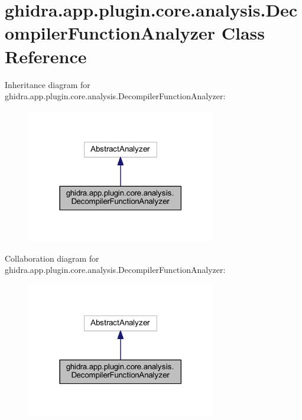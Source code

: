 \hypertarget{classghidra_1_1app_1_1plugin_1_1core_1_1analysis_1_1_decompiler_function_analyzer}{}\section{ghidra.\+app.\+plugin.\+core.\+analysis.\+Decompiler\+Function\+Analyzer Class Reference}
\label{classghidra_1_1app_1_1plugin_1_1core_1_1analysis_1_1_decompiler_function_analyzer}


Inheritance diagram for ghidra.\+app.\+plugin.\+core.\+analysis.\+Decompiler\+Function\+Analyzer\+:
\nopagebreak
\begin{figure}[H]
\begin{center}
\leavevmode
\includegraphics[width=234pt]{classghidra_1_1app_1_1plugin_1_1core_1_1analysis_1_1_decompiler_function_analyzer__inherit__graph}
\end{center}
\end{figure}


Collaboration diagram for ghidra.\+app.\+plugin.\+core.\+analysis.\+Decompiler\+Function\+Analyzer\+:
\nopagebreak
\begin{figure}[H]
\begin{center}
\leavevmode
\includegraphics[width=234pt]{classghidra_1_1app_1_1plugin_1_1core_1_1analysis_1_1_decompiler_function_analyzer__coll__graph}
\end{center}
\end{figure}
